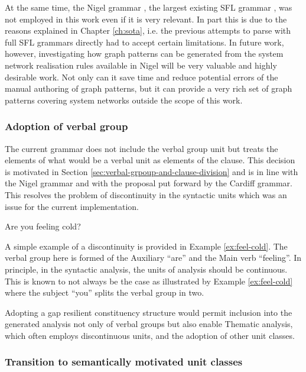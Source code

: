     At the same time, the Nigel grammar \citep{Matthiessen95-all}, the largest existing SFL grammar \citep[27]{Bateman2008}, was not employed in this work even if it is very relevant. In part this is due to the reasons explained in Chapter \ref{ch:sota}, i.e. the previous attempts to parse with full SFL grammars directly had to accept certain limitations. In future work, however, investigating how graph patterns can be generated from the system network realisation rules available in Nigel will be very valuable and highly desirable work. Not only can it save time and reduce potential errors of the manual authoring of graph patterns, but it can provide a very rich set of graph patterns covering system networks outside the scope of this work.

\subsubsection{Adoption of verbal group}

    The current grammar does not include the verbal group unit but treats the elements of what would be a verbal unit as elements of the clause. This decision is motivated in Section \ref{sec:verbal-grpoup-and-clause-division} and is in line with the Nigel grammar and with the proposal put forward by the Cardiff grammar. This resolves the problem of discontinuity in the syntactic units which was an issue for the current implementation.
    
    \begin{exe}
        \ex\label{ex:feel-cold} Are you feeling cold?
    \end{exe}
    
    A simple example of a discontinuity is provided in Example \ref{ex:feel-cold}. The verbal group here is formed of the Auxiliary ``are'' and the Main verb ``feeling''. In principle, in the syntactic analysis, the units of analysis should be continuous. This is known to not always be the case as illustrated by Example \ref{ex:feel-cold} where the subject ``you'' splits the verbal group in two.
    
    Adopting a gap resilient constituency structure would permit inclusion into the generated analysis not only of verbal groups but also enable Thematic analysis, which often employs discontinuous units, and the adoption of other unit classes.

\subsubsection{Transition to semantically motivated unit classes}

